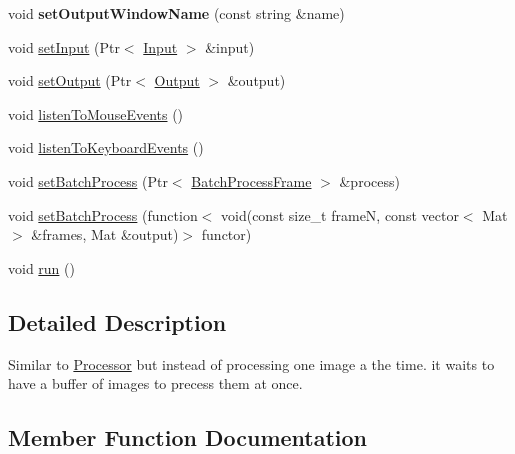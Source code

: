 \begin{DoxyCompactItemize}
\item 
void {\bfseries set\+Output\+Window\+Name} (const string \&name)\hypertarget{classviva_1_1_batch_processor_a8c3d7236ad429e7e34314bbe4671e273}{}\label{classviva_1_1_batch_processor_a8c3d7236ad429e7e34314bbe4671e273}

\item 
void \hyperlink{classviva_1_1_batch_processor_a589cdff013969f82d0700f2554ea27e6}{set\+Input} (Ptr$<$ \hyperlink{classviva_1_1_input}{Input} $>$ \&input)
\item 
void \hyperlink{classviva_1_1_batch_processor_af64e5c8ac7efc84d3a06686904c2bb41}{set\+Output} (Ptr$<$ \hyperlink{classviva_1_1_output}{Output} $>$ \&output)
\item 
void \hyperlink{classviva_1_1_batch_processor_ae90fb5c35d3a2436b9927165c5ceab68}{listen\+To\+Mouse\+Events} ()
\item 
void \hyperlink{classviva_1_1_batch_processor_af9375597f9d7b18cc55749cc41dfdc4b}{listen\+To\+Keyboard\+Events} ()
\item 
void \hyperlink{classviva_1_1_batch_processor_af5fff916708c4a6bf8e993a2e41e50cf}{set\+Batch\+Process} (Ptr$<$ \hyperlink{classviva_1_1_batch_process_frame}{Batch\+Process\+Frame} $>$ \&process)
\item 
void \hyperlink{classviva_1_1_batch_processor_aa0fc92aaedcee9bf24789dd7ea62fadf}{set\+Batch\+Process} (function$<$ void(const size\+\_\+t frameN, const vector$<$ Mat $>$ \&frames, Mat \&output)$>$ functor)
\item 
void \hyperlink{classviva_1_1_batch_processor_ae83a5e89bdfcd9613d13b702959b47dc}{run} ()
\end{DoxyCompactItemize}


\subsection{Detailed Description}
Similar to \hyperlink{classviva_1_1_processor}{Processor} but instead of processing one image a the time. it waits to have a buffer of images to precess them at once. 

\subsection{Member Function Documentation}

